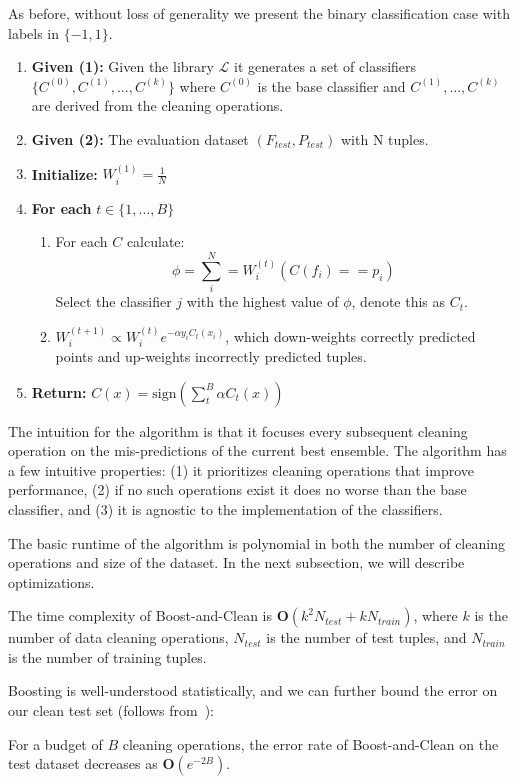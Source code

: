 As before, without loss of generality we present the binary classification case with labels in $\{-1,1\}$.
\begin{enumerate}
    \item \textbf{Given (1): } Given the library $\mathcal{L}$ it generates a set of classifiers $\{C^{(0)}, C^{(1)},...,C^{(k)}\}$ where $C^{(0)}$ is the base classifier and $C^{(1)},...,C^{(k)}$ are derived from the cleaning operations.
    \item \textbf{Given (2): } The evaluation dataset $(F_{test}, P_{test})$ with N tuples.
    \item \textbf{Initialize: } $W^{(1)}_i = \frac{1}{N}$
    \item \textbf{For each } $t \in \{1,...,B\}$ 
    \begin{enumerate}
    \item For each $C$ calculate: \[\phi = \sum_i^N = W^{(t)}_i (C(f_i) == p_i)\]
    Select the classifier $j$ with the highest value of $\phi$, denote this as $C_t$.
    \item $W^{(t+1)}_i \propto W^{(t)}_i e^{-\alpha y_i C_t(x_i)}$, which down-weights correctly predicted points and up-weights incorrectly predicted tuples.
    \end{enumerate}
    \item \textbf{Return: } $C(x) = \text{sign}(\sum_t^B \alpha C_t(x) )$  
\end{enumerate}

The intuition for the algorithm is that it focuses every subsequent cleaning operation on the mis-predictions of the current best ensemble.
The algorithm has a few intuitive properties: (1) it prioritizes cleaning operations that improve performance, (2) if no such operations exist it does no worse than the base classifier, and (3) it is agnostic to the implementation of the classifiers.

The basic runtime of the algorithm is polynomial in both the number of cleaning operations and size of the dataset. In the next subsection, we will describe optimizations.

\begin{proposition}
The time complexity of Boost-and-Clean is $\mathbf{O}(k^2 N_{test} + k N_{train})$, where $k$ is the number of data cleaning operations, $N_{test}$ is the number of test tuples, and $N_{train}$ is the number of training tuples.
\end{proposition}

Boosting is well-understood statistically, and we can further bound the error on our clean test set (follows from~\cite{schapire2003boosting}):

\begin{proposition}
For a budget of $B$ cleaning operations, the error rate of Boost-and-Clean on the test dataset decreases as $\mathbf{O}(e^{-2B})$.
\end{proposition}


